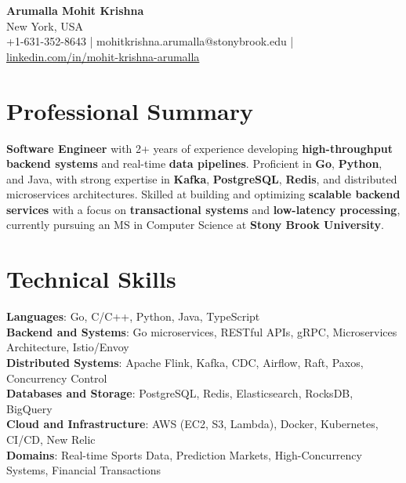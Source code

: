 \documentclass[letterpaper,11pt]{article}
\begin{document}
\begin{center}
  {\Large \textbf{Arumalla Mohit Krishna}} \\
  New York, USA \\
  +1-631-352-8643 \enspace | \enspace mohitkrishna.arumalla@stonybrook.edu \enspace | \enspace \href{https://www.linkedin.com/in/mohit-krishna-arumalla}{linkedin.com/in/mohit-krishna-arumalla}
\end{center}

\section{Professional Summary}
  \begin{itemize}[leftmargin=0.15in, label={}]
    \small{\item{
     \textbf{Software Engineer} with 2+ years of experience developing \textbf{high-throughput backend systems} and real-time \textbf{data pipelines}. Proficient in \textbf{Go}, \textbf{Python}, and Java, with strong expertise in \textbf{Kafka}, \textbf{PostgreSQL}, \textbf{Redis}, and distributed microservices architectures. Skilled at building and optimizing \textbf{scalable backend services} with a focus on \textbf{transactional systems} and \textbf{low-latency processing}, currently pursuing an MS in Computer Science at \textbf{Stony Brook University}.
    }}
  \end{itemize}
\vspace{-16pt}

\section{Technical Skills}
 \begin{itemize}[leftmargin=0.15in, label={}]
    \small{\item{
     \textbf{Languages}: Go, C/C++, Python, Java, TypeScript \\
     \textbf{Backend and Systems}: Go microservices, RESTful APIs, gRPC, Microservices Architecture, Istio/Envoy \\
     \textbf{Distributed Systems}: Apache Flink, Kafka, CDC, Airflow, Raft, Paxos, Concurrency Control \\
     \textbf{Databases and Storage}: PostgreSQL, Redis, Elasticsearch, RocksDB, BigQuery \\
     \textbf{Cloud and Infrastructure}: AWS (EC2, S3, Lambda), Docker, Kubernetes, CI/CD, New Relic \\
     \textbf{Domains}: Real-time Sports Data, Prediction Markets, High-Concurrency Systems, Financial Transactions
    }}
 \end{itemize}
\vspace{-16pt}
\end{document}
